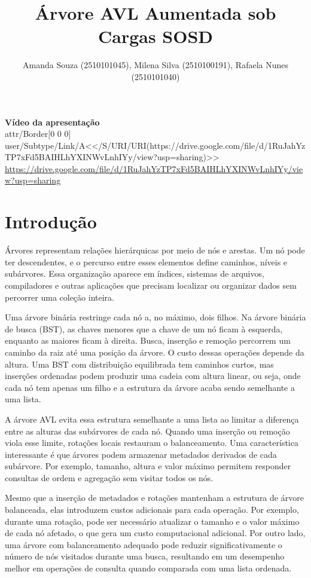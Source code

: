 \documentclass[12pt]{article}
\title{{Árvore AVL Aumentada sob Cargas SOSD}}
\author{Amanda Souza (2510101045), Milena Silva (2510100191), Rafaela Nunes (2510101040)}
\begin{document}
 
\maketitle

\begin{center}
\textbf{Vídeo da apresentação}\\
{\small{}\color{blue}\leavevmode
\pdfstartlink attr{/Border[0 0 0]} user{/Subtype/Link/A<</S/URI/URI(https://drive.google.com/file/d/1RuJahYzTP7xFd5BAIHLhYXINWvLnhIYy/view?usp=sharing)>>}
\url{https://drive.google.com/file/d/1RuJahYzTP7xFd5BAIHLhYXINWvLnhIYy/view?usp=sharing}\pdfendlink}
\end{center}

\section{Introdução}\label{sec:introduction}

{Árvores representam relações hierárquicas por meio de nós e arestas. Um nó pode ter descendentes, e o percurso entre esses elementos define caminhos, níveis e subárvores. Essa organização aparece em índices, sistemas de arquivos, compiladores e outras aplicações que precisam localizar ou organizar dados sem percorrer uma coleção inteira.}

{Uma árvore binária restringe cada nó a, no máximo, dois filhos. Na árvore binária de busca (BST), as chaves menores que a chave de um nó ficam à esquerda, enquanto as maiores ficam à direita. Busca, inserção e remoção percorrem um caminho da raiz até uma posição da árvore. O custo dessas operações depende da altura. Uma BST com distribuição equilibrada tem caminhos curtos, mas inserções ordenadas podem produzir uma cadeia com altura linear, ou seja, onde cada nó tem apenas um filho e a estrutura da árvore acaba sendo semelhante a uma lista.}

{A árvore AVL evita essa estrutura semelhante a uma lista ao limitar a diferença entre as alturas das subárvores de cada nó. Quando uma inserção ou remoção viola esse limite, rotações locais restauram o balanceamento. Uma característica interessante é que árvores podem armazenar metadados derivados de cada subárvore. Por exemplo, tamanho, altura e valor máximo permitem responder consultas de ordem e agregação sem visitar todos os nós.}

{Mesmo que a inserção de metadados e rotações mantenham a estrutura de árvore balanceada, elas introduzem custos adicionais para cada operação. Por exemplo, durante uma rotação, pode ser necessário atualizar o tamanho e o valor máximo de cada nó afetado, o que gera um custo computacional adicional. Por outro lado, uma árvore com balanceamento adequado pode reduzir significativamente o número de nós visitados durante uma busca, resultando em um desempenho melhor em operações de consulta quando comparada com uma lista ordenada.}
\end{document}
